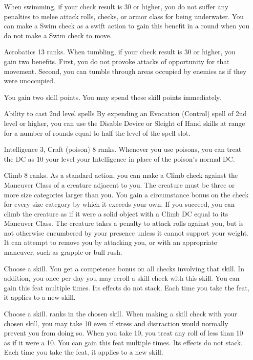 When swimming, if your check result is 30 or higher, you do not suffer any penalties to melee attack rolls, checks, or armor class for being underwater. You can make a Swim check as a swift action to gain this benefit in a round when you do not make a Swim check to move.

\featpre Acrobatics 13 ranks.
\featben When tumbling, if your check result is 30 or higher, you gain two benefits. First, you do not provoke attacks of opportunity for that movement. Second, you can tumble through areas occupied by enemies as if they were unoccupied.

 You gain two skill points. You may spend these skill points immediately.

 Ability to cast 2nd level spells
 By expending an Evocation (Control) spell of 2nd level or higher, you can use the Disable Device or Sleight of Hand skills at \rngclose range for a number of rounds equal to half the level of the spell slot.

\featpre Intelligence 3, Craft (poison) 8 ranks.
\featben Whenever you use poisons, you can treat the DC as 10 \add your level \add your Intelligence in place of the poison's normal DC.

\featpre Climb 8 ranks. 
\featben As a standard action, you can make a Climb check against the Maneuver Class of a creature adjacent to you. The creature must be three or more size categories larger than you. You gain a  circumstance bonus on the check for every size category by which it exceeds your own. If you succeed, you can climb the creature as if it were a solid object with a Climb DC equal to its Maneuver Class. The creature takes a  penalty to attack rolls against you, but is not otherwise encumbered by your presence unless it cannot support your weight. It can attempt to remove you by attacking you, or with an appropriate maneuver, such as grapple or bull rush.

Choose a skill.
 You get a  competence bonus on all checks involving that skill. In addition, you once per day you may reroll a skill check with this skill.
 You can gain this feat multiple times. Its effects do not stack. Each time you take the feat, it applies to a new skill.

Choose a skill.
 ranks in the chosen skill.
\featben When making a skill check with your chosen skill, you may take 10 even if stress and distraction would normally prevent you from doing so. When you take 10, you treat any roll of less than 10 as if it were a 10.
 You can gain this feat multiple times. Its effects do not stack. Each time you take the feat, it applies to a new skill.

